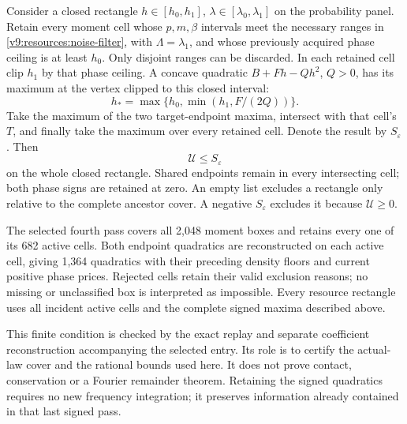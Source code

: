 Consider a closed rectangle $h\in[h_0,h_1]$,
$\lambda\in[\lambda_0,\lambda_1]$ on the probability panel. Retain
every moment cell whose $p,m,\beta$ intervals meet the necessary ranges
in \eqref{v9:resources:noise-filter}, with $\Lambda=\lambda_1$, and
whose previously acquired phase ceiling is at least $h_0$.
Only disjoint ranges can be discarded. In each retained cell clip $h_1$
by that phase ceiling. A concave quadratic $B+Fh-Qh^2$, $Q>0$,
has its maximum at the vertex clipped to this closed interval:
\[
 h_* =\max\{h_0,\min(h_1,F/(2Q))\}.
\]
Take the maximum of the two target-endpoint maxima, intersect with that
cell's $T$, and finally take the maximum over every retained cell.
Denote the result by $S_\varepsilon$. Then
\begin{equation}\label{v9:resources:rectangle}
 \mathcal U\le S_\varepsilon
\end{equation}
on the whole closed rectangle. Shared endpoints remain in every
intersecting cell; both phase signs are retained at zero. An empty list
excludes a rectangle only relative to the complete ancestor cover.
A negative $S_\varepsilon$ excludes it because $\mathcal U\ge0$.

\begin{condition}\label{v9:resources:phase-condition}
The selected fourth pass covers all 2,048 moment boxes and retains every
one of its 682 active cells. Both endpoint quadratics are reconstructed
on each active cell, giving 1,364 quadratics with their preceding density
floors and current positive phase prices. Rejected cells retain their
valid exclusion reasons; no missing or unclassified box is interpreted
as impossible. Every resource rectangle uses all incident active cells
and the complete signed maxima described above.
\end{condition}

This finite condition is checked by the exact replay and separate
coefficient reconstruction accompanying the selected entry. Its role is
to certify the actual-law cover and the rational bounds used here.
It does not prove contact, conservation or a Fourier remainder theorem.
Retaining the signed quadratics requires no new frequency integration;
it preserves information already contained in that last signed pass.

